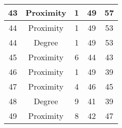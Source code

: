 \documentclass[results.tex]{subfiles}
\begin{document}
\begin{center}
\begin{tabular}{| c || c | c | c | c |}
            \hline
            43                      & Proximity                    & 1                      & 49                      & 57                   \\
            \hline
            44                      & Proximity                    & 1                      & 49                      & 53                   \\
            \hline
            44                      & Degree                       & 1                      & 49                      & 53                   \\
            \hline
            45                      & Proximity                    & 6                      & 44                      & 43                   \\
            \hline
            46                      & Proximity                    & 1                      & 49                      & 39                   \\
            \hline
            47                      & Proximity                    & 4                      & 46                      & 45                   \\
            \hline
            48                      & Degree                       & 9                      & 41                      & 39                   \\
            \hline
            49                      & Proximity                    & 8                      & 42                      & 47                   \\
            \hline
        \end{tabular}
    \end{center}
\end{document}
